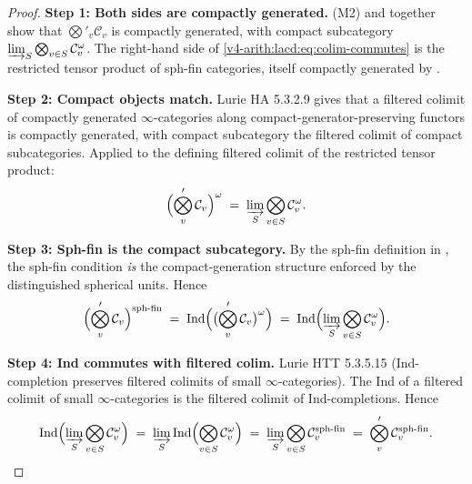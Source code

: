 \begin{proof}
\textbf{Step 1: Both sides are compactly generated.}
(M2) and
 together show that
\(\bigotimes'_{v}\mathcal{C}_{v}\) is compactly generated, with compact
subcategory
\(\varinjlim_{S}\bigotimes_{v\in S}\mathcal{C}_{v}^{\omega}\). The
right-hand side of \eqref{v4-arith:lacd:eq:colim-commutes} is the
restricted tensor product of sph-fin categories, itself compactly
generated by .

\textbf{Step 2: Compact objects match.} Lurie HA 5.3.2.9 gives that
a filtered colimit of compactly generated \(\infty\)-categories
along compact-generator-preserving functors is compactly generated,
with compact subcategory the filtered colimit of compact
subcategories. Applied to the defining filtered colimit of the
restricted tensor product:
\begin{equation}
\Bigl(\bigotimes_{v}^{\prime}\mathcal{C}_{v}\Bigr)^{\omega}
\;=\;\varinjlim_{S}\bigotimes_{v\in S}\mathcal{C}_{v}^{\omega}.
\end{equation}

\textbf{Step 3: Sph-fin is the compact subcategory.} By the sph-fin
definition in
, the sph-fin condition
\emph{is} the compact-generation structure enforced by the
distinguished spherical units. Hence
\begin{equation}
\Bigl(\bigotimes_{v}^{\prime}\mathcal{C}_{v}\Bigr)^{\mathrm{sph\text{-}fin}}
\;=\;\mathrm{Ind}\Bigl(\bigl(\bigotimes_{v}^{\prime}\mathcal{C}_{v}\bigr)^{\omega}\Bigr)
\;=\;\mathrm{Ind}\Bigl(\varinjlim_{S}\bigotimes_{v\in S}\mathcal{C}_{v}^{\omega}\Bigr).
\end{equation}

\textbf{Step 4: Ind commutes with filtered colim.} Lurie HTT 5.3.5.15
(Ind-completion preserves filtered colimits of small
\(\infty\)-categories). The Ind of a filtered colimit of small
\(\infty\)-categories is the filtered colimit of Ind-completions.
Hence
\begin{equation}
\mathrm{Ind}\Bigl(\varinjlim_{S}\bigotimes_{v\in S}\mathcal{C}_{v}^{\omega}\Bigr)
\;=\;\varinjlim_{S}\mathrm{Ind}\Bigl(\bigotimes_{v\in S}\mathcal{C}_{v}^{\omega}\Bigr)
\;=\;\varinjlim_{S}\bigotimes_{v\in S}\mathcal{C}_{v}^{\mathrm{sph\text{-}fin}}
\;=\;\bigotimes_{v}^{\prime}\mathcal{C}_{v}^{\mathrm{sph\text{-}fin}}.
\end{equation}


\end{proof}
